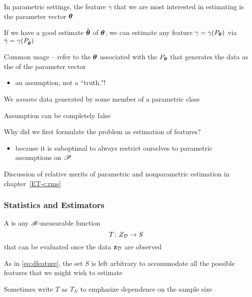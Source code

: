 \begin{frame}
    
    \vspace{2em}
    In parametric settings, the feature $\gamma$ that we are most interested
    in estimating is the parameter vector ${\boldsymbol \theta}$
    
    \vspace{.7em}
    If we have a good estimate
    $\hat {\boldsymbol \theta}$ of ${\boldsymbol \theta}$, we can estimate any feature $\gamma =
    \gamma(P_{{\boldsymbol \theta}})$ via $\hat \gamma = \gamma(P_{\hat {\boldsymbol \theta}})$
    
\end{frame}

\begin{frame}
    
    \vspace{2em}
    Common usage -- refer to the ${\boldsymbol \theta}$ associated
    with the $P_{\boldsymbol \theta}$ that generates the data as the  of
    the parameter vector
    \begin{itemize}
    \item  an assumption, not a ``truth."!
    \end{itemize}
    
    We \emph{assume} data generated by
    some member of a parametric class
    
    Assumption can be completely false
    
\end{frame}

\begin{frame}
    
    \vspace{2em}
    Why did we first formulate the problem as estimation of features?
    \begin{itemize}
        \item because it is suboptimal to always
        restrict ourselves to parametric assumptions on $\mathscr P$
    \end{itemize}
    
    Discussion of relative merits of parametric and 
    nonparametric estimation in chapter~\ref{ET-c:rms}
    
\end{frame}

\begin{frame}\frametitle{Statistics and Estimators}
    
    \vspace{2em}
    A  is any $\mathscr B$-measurable function 
    \begin{equation*}
        T \colon Z_{\mathcal D} \to S
    \end{equation*}
    that can be evaluated once the data $\mathbf{z}_{\mathcal D}$ are observed
    
    \vspace{.7em}
    As in \eqref{eq:dfeature}, the
    set $S$ is left arbitrary to accommodate all the possible features that we
    might wish to estimate
    
    Sometimes write $T$ as $T_N$ to emphasize
    dependence on the sample size
    
\end{frame}

